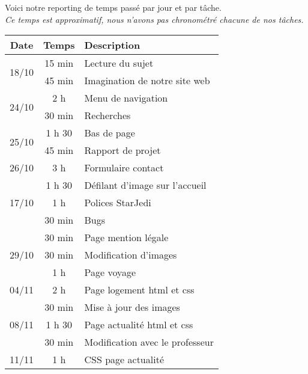 Voici notre reporting de temps passé par jour et par tâche. \\
\textit{Ce temps est approximatif, nous n'avons pas chronométré chacune de nos tâches.} 
\bigbreak

\begin{center}
\begin{tabular}{|c|c|l|}
    \hline
    \textbf{Date} & \textbf{Temps} & \textbf{Description} \\
    
    \hline
     \multirow{2}{*}{18/10} & 15 min & Lecture du sujet \\
            & 45 min & Imagination de notre site web \\
            
    \hline
     \multirow{2}{*}{24/10} & 2 h & Menu de navigation \\
            & 30 min & Recherches  \\
            
    \hline
    \multirow{2}{*}{25/10} & 1 h 30 & Bas de page \\
            & 45 min & Rapport de projet \\
    
    \hline
    26/10 & 3 h & Formulaire contact \\
    
    \hline
    \multirow{3}{*}{17/10} & 1 h 30 & Défilant d'image sur l'accueil \\
        & 1 h & Polices StarJedi \\
        & 30 min & Bugs \\
    
    \hline
    \multirow{3}{*}{29/10} & 30 min & Page mention légale \\
        & 30 min & Modification d'images \\
        & 1 h & Page voyage \\
    
    \hline
    04/11 & 2 h & Page logement html et css \\
    
    \hline
    \multirow{3}{*}{08/11} & 30 min & Mise à jour des images \\
        & 1 h 30 & Page actualité html et css \\
        & 30 min & Modification avec le professeur \\
        
    \hline
    11/11 & 1 h & CSS page actualité \\
    

\end{tabular}
\end{center}
